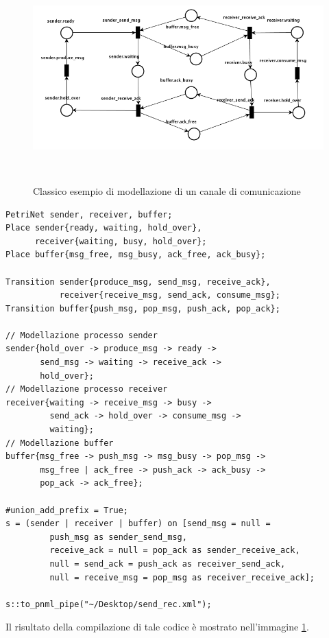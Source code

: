 \documentclass[italian,12pt]{book}
\begin{document}
\begin{figure}[htb]
\centerline{\includegraphics[width=12cm, height=8cm]{img/send_rec.png}}
\caption{Classico esempio di modellazione di un canale di comunicazione}\label{fig:send_rec.png}
\end{figure}

\begin{verbatim}PetriNet sender, receiver, buffer;
Place sender{ready, waiting, hold_over}, 
      receiver{waiting, busy, hold_over};
Place buffer{msg_free, msg_busy, ack_free, ack_busy};

Transition sender{produce_msg, send_msg, receive_ack}, 
           receiver{receive_msg, send_ack, consume_msg};
Transition buffer{push_msg, pop_msg, push_ack, pop_ack};

// Modellazione processo sender
sender{hold_over -> produce_msg -> ready -> 
       send_msg -> waiting -> receive_ack -> 
       hold_over};
// Modellazione processo receiver
receiver{waiting -> receive_msg -> busy -> 
         send_ack -> hold_over -> consume_msg ->
         waiting};
// Modellazione buffer
buffer{msg_free -> push_msg -> msg_busy -> pop_msg -> 
       msg_free | ack_free -> push_ack -> ack_busy -> 
       pop_ack -> ack_free};

#union_add_prefix = True;
s = (sender | receiver | buffer) on [send_msg = null = 
         push_msg as sender_send_msg, 
         receive_ack = null = pop_ack as sender_receive_ack, 
         null = send_ack = push_ack as receiver_send_ack,  
         null = receive_msg = pop_msg as receiver_receive_ack];

s::to_pnml_pipe("~/Desktop/send_rec.xml");

\end{verbatim}

Il risultato della compilazione di tale codice è mostrato nell'immagine \ref{fig:send_rec.png}.
\end{document}
